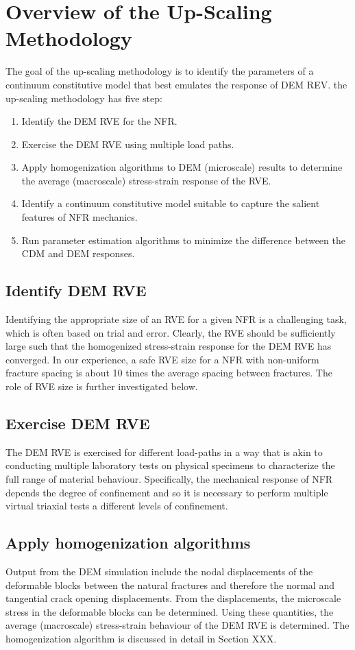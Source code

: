 \section{Overview of the Up-Scaling Methodology}
The goal of the up-scaling methodology is to identify the parameters of a continuum constitutive model that best emulates the response of DEM REV. the up-scaling methodology has five step: 
\begin{enumerate}
    \item Identify the DEM RVE for the NFR.
	\item Exercise the  DEM RVE using multiple load paths.
	\item Apply homogenization algorithms to DEM (microscale) results to determine the average (macroscale) stress-strain response of the RVE.
	\item Identify a continuum constitutive model suitable to capture the salient features of NFR mechanics.
	\item Run parameter estimation algorithms to minimize the difference between the CDM and DEM responses.
\end{enumerate}

\subsection*{Identify DEM RVE}
Identifying the appropriate size of an RVE for a given NFR is a challenging task, which is often based on trial and error. Clearly, the RVE should be sufficiently large such that the homogenized stress-strain response for the DEM RVE has converged. In our experience, a safe RVE size for a NFR with non-uniform fracture spacing is about 10 times the average spacing between fractures. The role of RVE size is further investigated below.

\subsection*{Exercise DEM RVE}
The DEM RVE is exercised for different load-paths in a way that is akin  to conducting multiple laboratory tests on physical specimens to characterize the full range of material behaviour. Specifically, the mechanical response of NFR depends the degree of confinement and so it is necessary to perform multiple virtual triaxial tests a different levels of confinement. 

\subsection*{Apply homogenization algorithms}
Output from the DEM simulation include the nodal displacements of the deformable blocks between the natural fractures and therefore the normal and tangential crack opening displacements. From the displacements, the microscale stress in the deformable blocks can be determined.  Using these quantities, the average (macroscale) stress-strain behaviour of the DEM RVE is determined. The homogenization algorithm is discussed in detail in Section XXX.

